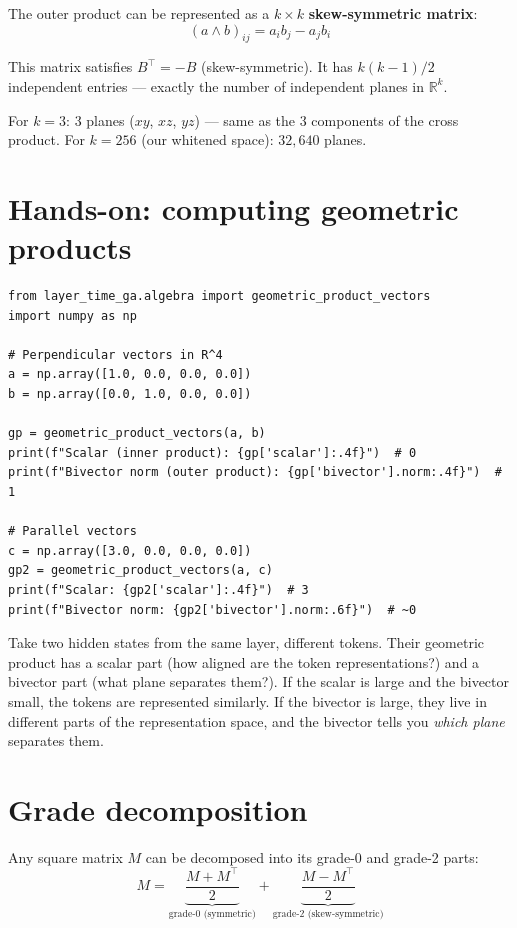 \documentclass[11pt, twoside, openright]{memoir}
\newcommand{\op}{\wedge}          %
\begin{document}
The outer product can be represented as a $k \times k$
\textbf{skew-symmetric matrix}:
\[
  (a \op b)_{ij} = a_i b_j - a_j b_i
\]

This matrix satisfies $B^\top = -B$ (skew-symmetric).  It has
$k(k-1)/2$ independent entries --- exactly the number of independent
planes in $\mathbb{R}^k$.

For $k = 3$: 3 planes ($xy$, $xz$, $yz$) --- same as the 3 components
of the cross product.  For $k = 256$ (our whitened space): $32{,}640$
planes.

\section{Hands-on: computing geometric products}

\begin{lstlisting}[caption={The geometric product of two vectors}]
from layer_time_ga.algebra import geometric_product_vectors
import numpy as np

# Perpendicular vectors in R^4
a = np.array([1.0, 0.0, 0.0, 0.0])
b = np.array([0.0, 1.0, 0.0, 0.0])

gp = geometric_product_vectors(a, b)
print(f"Scalar (inner product): {gp['scalar']:.4f}")  # 0
print(f"Bivector norm (outer product): {gp['bivector'].norm:.4f}")  # 1

# Parallel vectors
c = np.array([3.0, 0.0, 0.0, 0.0])
gp2 = geometric_product_vectors(a, c)
print(f"Scalar: {gp2['scalar']:.4f}")  # 3
print(f"Bivector norm: {gp2['bivector'].norm:.6f}")  # ~0
\end{lstlisting}

\begin{transformer}
Take two hidden states from the same layer, different tokens.  Their
geometric product has a scalar part (how aligned are the token
representations?) and a bivector part (what plane separates them?).
If the scalar is large and the bivector small, the tokens are
represented similarly.  If the bivector is large, they live in different
parts of the representation space, and the bivector tells you
\emph{which plane} separates them.
\end{transformer}

\section{Grade decomposition}

Any square matrix $M$ can be decomposed into its grade-0 and grade-2
parts:
\[
  M = \underbrace{\frac{M + M^\top}{2}}_{\text{grade-0 (symmetric)}}
    + \underbrace{\frac{M - M^\top}{2}}_{\text{grade-2 (skew-symmetric)}}
\]
\end{document}
